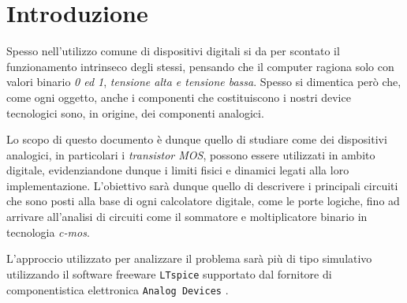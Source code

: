 \section*{Introduzione}
	Spesso nell'utilizzo comune di dispositivi digitali si da per scontato il funzionamento intrinseco degli stessi, pensando che il computer ragiona solo con valori binario \textit{0 ed 1}, \textit{tensione alta e tensione bassa}. Spesso si dimentica però che, come ogni oggetto, anche i componenti che costituiscono i nostri device tecnologici sono, in origine, dei componenti analogici.
	
	Lo scopo di questo documento è dunque quello di studiare come dei dispositivi analogici, in particolari i \textit{transistor MOS}, possono essere utilizzati in ambito digitale, evidenziandone dunque i limiti fisici e dinamici legati alla loro implementazione. L'obiettivo sarà dunque quello di descrivere i principali circuiti che sono posti alla base di ogni calcolatore digitale, come le porte logiche, fino ad arrivare all'analisi di circuiti come il sommatore e moltiplicatore binario in tecnologia \textit{c-mos}.
	
	L'approccio utilizzato per analizzare il problema sarà più di tipo simulativo utilizzando il software freeware \texttt{LTspice} \cite{ltspice} supportato dal fornitore di componentistica elettronica \texttt{Analog Devices}	.